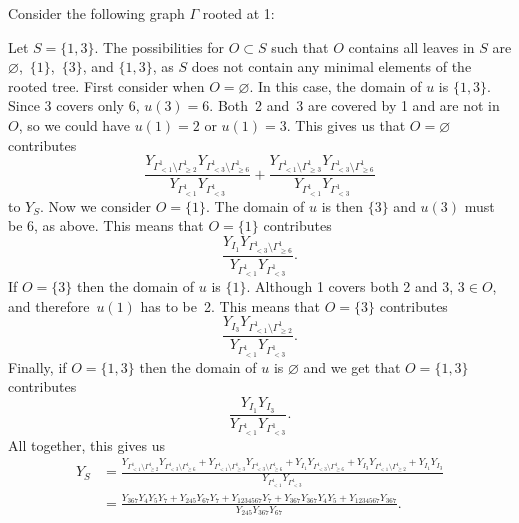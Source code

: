 \documentclass[pdftex]{sigma}
\numberwithin{equation}{section}
\begin{document}
\begin{Example}Consider the following graph $\Gamma$ rooted at 1:
\begin{center}
\end{center}
Let $S=\{1,3\}$. The possibilities for $O\subset S$ such that $O$ contains all leaves in $S$ are $\varnothing$,~$\{1\}$,~$\{3\}$, and $\{1,3\}$, as $S$ does not contain any minimal elements of the rooted tree. First consider when $O=\varnothing$. In this case, the domain of $u$ is $\{1,3\}$. Since 3 covers only 6, $u(3)=6$. Both~2 and~3 are covered by 1 and are not in $O$, so we could have $u(1)=2$ or $u(1)=3$. This gives us that $O=\varnothing$ contributes
\[ \frac{Y_{\Gamma_{< 1}^1\setminus\Gamma_{\geq 2}^1}Y_{\Gamma_{< 3}^1\setminus\Gamma_{\geq 6}^1}}{Y_{\Gamma_{< 1}^1}Y_{\Gamma_{< 3}^1}}+\frac{Y_{\Gamma_{< 1}^1\setminus\Gamma_{\geq 3}^1}Y_{\Gamma_{< 3}^1\setminus\Gamma_{\geq 6}^1}}{Y_{\Gamma_{< 1}^1}Y_{\Gamma_{< 3}^1}}\]
to $Y_S$.
Now we consider $O=\{1\}$. The domain of $u$ is then $\{3\}$ and $u(3)$ must be 6, as above. This means that $O=\{1\}$ contributes \[ \frac{Y_{I_1}Y_{\Gamma_{< 3}^1\setminus\Gamma_{\geq 6}^1}}{Y_{\Gamma_{< 1}^1}Y_{\Gamma_{< 3}^1}}.\]
If $O=\{3\}$ then the domain of $u$ is $\{1\}$. Although 1 covers both 2 and 3, $3\in O$, and therefore~$u(1)$ has to be~2. This means that $O=\{3\}$ contributes
\[ \frac{Y_{I_3}Y_{\Gamma_{< 1}^1\setminus\Gamma_{\geq 2}^1}}{Y_{\Gamma_{< 1}^1}Y_{\Gamma_{< 3}^1}}.\]
Finally, if $O=\{1,3\}$ then the domain of $u$ is $\varnothing$ and we get that $O=\{1,3\}$ contributes \[ \frac{Y_{I_1}Y_{I_3}}{Y_{\Gamma_{< 1}^1}Y_{\Gamma_{< 3}^1}}.\]
All together, this gives us
\begin{align*}
Y_S&=\frac{Y_{\Gamma_{< 1}^1\setminus\Gamma_{\geq 2}^1}Y_{\Gamma_{< 3}^1\setminus\Gamma_{\geq 6}^1}+Y_{\Gamma_{< 1}^1\setminus\Gamma_{\geq 3}^1}Y_{\Gamma_{< 3}^1\setminus\Gamma_{\geq 6}^1}+Y_{I_1}Y_{\Gamma_{< 3}^1\setminus\Gamma_{\geq 6}^1}+Y_{I_3}Y_{\Gamma_{< 1}^1\setminus\Gamma_{\geq 2}^1}+Y_{I_1}Y_{I_3}}{Y_{\Gamma_{< 1}^1}Y_{\Gamma_{< 3}^1}}\\
&=\frac{Y_{367}Y_4Y_5Y_7+Y_{245}Y_{67}Y_7+Y_{1234567}Y_7+Y_{367}Y_{367}Y_4Y_5+Y_{1234567}Y_{367}}{Y_{245}Y_{367}Y_{67}}.
\end{align*}
\end{Example}
\end{document}
